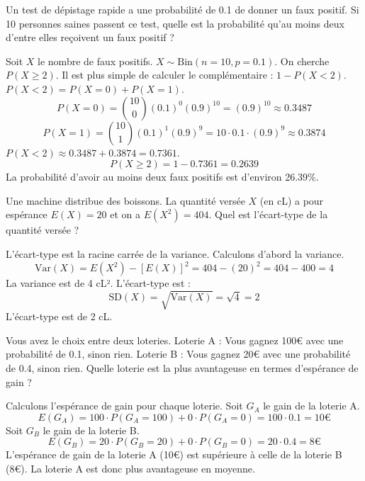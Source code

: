 \begin{exercicebox}
Un test de dépistage rapide a une probabilité de 0.1 de donner un faux positif. Si 10 personnes saines passent ce test, quelle est la probabilité qu'au moins deux d'entre elles reçoivent un faux positif ?
\end{exercicebox}

\begin{correctionbox}
Soit $X$ le nombre de faux positifs. $X \sim \text{Bin}(n=10, p=0.1)$.
On cherche $P(X \ge 2)$. Il est plus simple de calculer le complémentaire : $1 - P(X < 2)$.
$P(X < 2) = P(X=0) + P(X=1)$.
$$ P(X=0) = \binom{10}{0}(0.1)^0(0.9)^{10} = (0.9)^{10} \approx 0.3487 $$
$$ P(X=1) = \binom{10}{1}(0.1)^1(0.9)^9 = 10 \cdot 0.1 \cdot (0.9)^9 \approx 0.3874 $$
$P(X < 2) \approx 0.3487 + 0.3874 = 0.7361$.
$$ P(X \ge 2) = 1 - 0.7361 = 0.2639 $$
La probabilité d'avoir au moins deux faux positifs est d'environ 26.39\%.
\end{correctionbox}

\begin{exercicebox}
Une machine distribue des boissons. La quantité versée $X$ (en cL) a pour espérance $E(X)=20$ et on a $E(X^2)=404$. Quel est l'écart-type de la quantité versée ?
\end{exercicebox}

\begin{correctionbox}
L'écart-type est la racine carrée de la variance. Calculons d'abord la variance.
$$ \text{Var}(X) = E(X^2) - [E(X)]^2 = 404 - (20)^2 = 404 - 400 = 4 $$
La variance est de 4 cL².
L'écart-type est :
$$ \text{SD}(X) = \sqrt{\text{Var}(X)} = \sqrt{4} = 2 $$
L'écart-type est de 2 cL.
\end{correctionbox}

\begin{exercicebox}
Vous avez le choix entre deux loteries.
Loterie A : Vous gagnez 100€ avec une probabilité de 0.1, sinon rien.
Loterie B : Vous gagnez 20€ avec une probabilité de 0.4, sinon rien.
Quelle loterie est la plus avantageuse en termes d'espérance de gain ?
\end{exercicebox}

\begin{correctionbox}
Calculons l'espérance de gain pour chaque loterie.
Soit $G_A$ le gain de la loterie A.
$$ E(G_A) = 100 \cdot P(G_A=100) + 0 \cdot P(G_A=0) = 100 \cdot 0.1 = 10€ $$
Soit $G_B$ le gain de la loterie B.
$$ E(G_B) = 20 \cdot P(G_B=20) + 0 \cdot P(G_B=0) = 20 \cdot 0.4 = 8€ $$
L'espérance de gain de la loterie A (10€) est supérieure à celle de la loterie B (8€). La loterie A est donc plus avantageuse en moyenne.
\end{correctionbox}

